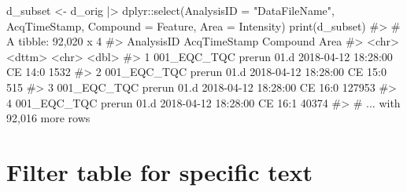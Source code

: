 \documentclass[
  letterpaper,
  DIV=11,
  numbers=noendperiod]{scrreprt}
\newenvironment{Shaded}{\begin{snugshade}}{\end{snugshade}}
\newcommand{\AttributeTok}[1]{\textcolor[rgb]{0.40,0.45,0.13}{#1}}
\newcommand{\CommentTok}[1]{\textcolor[rgb]{0.37,0.37,0.37}{#1}}
\newcommand{\FunctionTok}[1]{\textcolor[rgb]{0.28,0.35,0.67}{#1}}
\newcommand{\NormalTok}[1]{\textcolor[rgb]{0.00,0.23,0.31}{#1}}
\newcommand{\OtherTok}[1]{\textcolor[rgb]{0.00,0.23,0.31}{#1}}
\newcommand{\SpecialCharTok}[1]{\textcolor[rgb]{0.37,0.37,0.37}{#1}}
\newcommand{\StringTok}[1]{\textcolor[rgb]{0.13,0.47,0.30}{#1}}
\begin{document}
\begin{Shaded}
\begin{Highlighting}[]
\NormalTok{d\_subset }\OtherTok{\textless{}{-}}\NormalTok{ d\_orig }\SpecialCharTok{|\textgreater{}}\NormalTok{ dplyr}\SpecialCharTok{::}\FunctionTok{select}\NormalTok{(}\StringTok{\textasciigrave{}}\AttributeTok{AnalysisID}\StringTok{\textasciigrave{}} \OtherTok{=} \StringTok{"DataFileName"}\NormalTok{, }
\NormalTok{                             AcqTimeStamp, }\AttributeTok{Compound =}\NormalTok{ Feature, }
                             \AttributeTok{Area =}\NormalTok{ Intensity)}
\FunctionTok{print}\NormalTok{(d\_subset)}
\CommentTok{\#\textgreater{} \# A tibble: 92,020 x 4}
\CommentTok{\#\textgreater{}   AnalysisID              AcqTimeStamp        Compound   Area}
\CommentTok{\#\textgreater{}   \textless{}chr\textgreater{}                   \textless{}dttm\textgreater{}              \textless{}chr\textgreater{}     \textless{}dbl\textgreater{}}
\CommentTok{\#\textgreater{} 1 001\_EQC\_TQC prerun 01.d 2018{-}04{-}12 18:28:00 CE 14:0    1532}
\CommentTok{\#\textgreater{} 2 001\_EQC\_TQC prerun 01.d 2018{-}04{-}12 18:28:00 CE 15:0     515}
\CommentTok{\#\textgreater{} 3 001\_EQC\_TQC prerun 01.d 2018{-}04{-}12 18:28:00 CE 16:0  127953}
\CommentTok{\#\textgreater{} 4 001\_EQC\_TQC prerun 01.d 2018{-}04{-}12 18:28:00 CE 16:1   40374}
\CommentTok{\#\textgreater{} \# ... with 92,016 more rows}
\end{Highlighting}
\end{Shaded}

\hypertarget{filter-table-for-specific-text}{%
\section{Filter table for specific
text}\label{filter-table-for-specific-text}}
\end{document}
